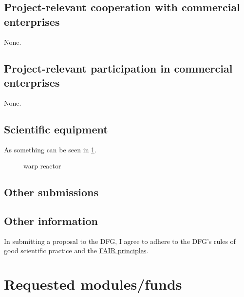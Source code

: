 \subsection{Project-relevant cooperation with commercial enterprises}
None.

\subsection{Project-relevant participation in commercial enterprises}
None.

\subsection{Scientific equipment}
As something can be seen in \cref{fig:some_nice_graph}.

\begin{figure}
	\centering
	\caption{warp reactor}
	\label{fig:some_nice_graph}
\end{figure}

\subsection{Other submissions}

\subsection{Other information}
In submitting a proposal to the DFG, I agree to adhere to the DFG's rules of good scientific practice and the \href{https://www.nature.com/articles/sdata201618}{FAIR principles}.

\section{Requested modules/funds}

